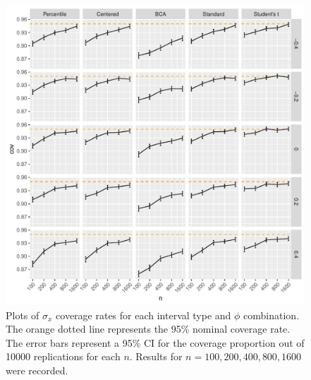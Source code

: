 \documentclass[12pt, letterpaper, titlepage]{article}
\begin{document}
\begin{figure}[tbp]
  \centering
  \includegraphics[width=\textwidth]{figures/plot_sigma}
  \caption{Plots of $\sigma_x$ coverage rates for each interval type and $\phi$
    combination. The orange dotted line represents the 95\% nominal coverage
    rate. The error bars represent a 95\% CI for the coverage
    proportion out of 10000 replications for each $n$. Results for 
    $n = 100, 200, 400, 800, 1600$ were recorded.}
  \label{fig:sigma}
\end{figure}
\end{document}
